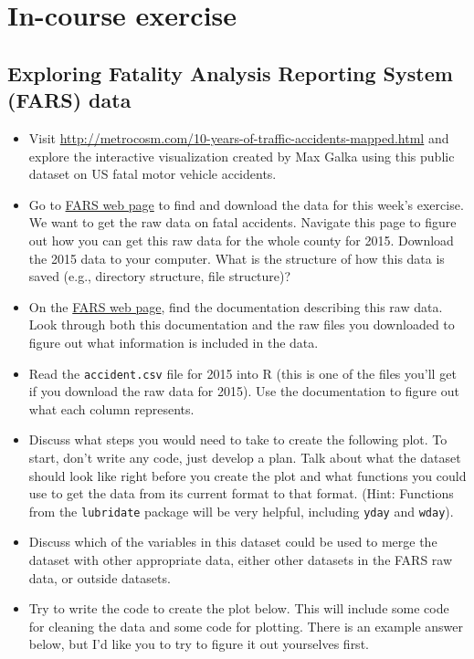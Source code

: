 \documentclass[]{book}
\providecommand{\tightlist}{%
  \setlength{\itemsep}{0pt}\setlength{\parskip}{0pt}}
\begin{document}
\section{In-course exercise}\label{in-course-exercise-6}

\subsection{Exploring Fatality Analysis Reporting System (FARS)
data}\label{exploring-fatality-analysis-reporting-system-fars-data-1}

\begin{itemize}
\tightlist
\item
  Visit
  \url{http://metrocosm.com/10-years-of-traffic-accidents-mapped.html}
  and explore the interactive visualization created by Max Galka using
  this public dataset on US fatal motor vehicle accidents.
\item
  Go to \href{http://www.nhtsa.gov/FARS}{FARS web page} to find and
  download the data for this week's exercise. We want to get the raw
  data on fatal accidents. Navigate this page to figure out how you can
  get this raw data for the whole county for 2015. Download the 2015
  data to your computer. What is the structure of how this data is saved
  (e.g., directory structure, file structure)?
\item
  On the \href{http://www.nhtsa.gov/FARS}{FARS web page}, find the
  documentation describing this raw data. Look through both this
  documentation and the raw files you downloaded to figure out what
  information is included in the data.
\item
  Read the \texttt{accident.csv} file for 2015 into R (this is one of
  the files you'll get if you download the raw data for 2015). Use the
  documentation to figure out what each column represents.
\item
  Discuss what steps you would need to take to create the following
  plot. To start, don't write any code, just develop a plan. Talk about
  what the dataset should look like right before you create the plot and
  what functions you could use to get the data from its current format
  to that format. (Hint: Functions from the \texttt{lubridate} package
  will be very helpful, including \texttt{yday} and \texttt{wday}).
\item
  Discuss which of the variables in this dataset could be used to merge
  the dataset with other appropriate data, either other datasets in the
  FARS raw data, or outside datasets.
\item
  Try to write the code to create the plot below. This will include some
  code for cleaning the data and some code for plotting. There is an
  example answer below, but I'd like you to try to figure it out
  yourselves first.
\end{itemize}
\end{document}
